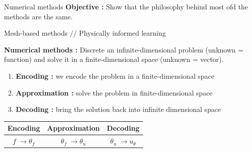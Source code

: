 \begin{frame}{Numerical methods}
	\textbf{Objective :} Show that the philosophy behind most ofd the methods are the same.
	\begin{center}
		Mesh-based methods \hspace{5pt} // \hspace{5pt} Physically informed learning
	\end{center}
	
	\textbf{Numerical methods :} Discrete an infinite-dimensional problem (unknown = function) and solve it in a finite-dimensional space (unknown = vector).
	\begin{enumerate}[\textbullet]
		\item \textbf{Encoding :} we encode the problem in a finite-dimensional space
		\item \textbf{Approximation :} solve the problem in finite-dimensional space
		\item \textbf{Decoding :} bring the solution back into infinite dimensional space
	\end{enumerate}
	
	\begin{center}
		\begin{tabular}{|c|c|c|}
			\hline
			\textbf{Encoding} & \textbf{Approximation} & \textbf{Decoding} \\
			\hline
			$f \; \rightarrow \theta_f$ & $\theta_f \; \rightarrow \theta_u$ & $\theta_u \; \rightarrow u_\theta$ \\
			\hline
		\end{tabular}
	\end{center}
\end{frame}
